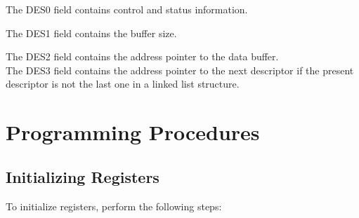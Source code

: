\documentclass[main\_\_EN.tex]{subfiles}
\begin{document}
The DES0 field contains control and status information.



The DES1 field contains the buffer size.



The DES2 field contains the address pointer to the data buffer.\\



The DES3 field contains the address pointer to the next descriptor if the present descriptor is not the last one in a linked list structure.



\section{Programming Procedures}

\subsection{Initializing Registers}

To initialize registers, perform the following steps:
\end{document}
